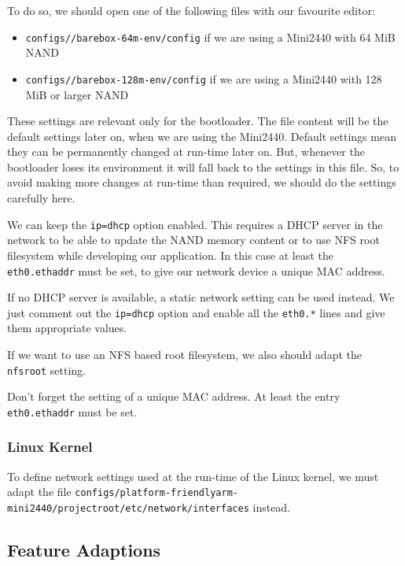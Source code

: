 To do so, we should open one of the following files with our favourite editor:

\begin{itemize}
 \item \texttt{configs/\ptxdistPlatformName /barebox-64m-env/config} if we are using
 a Mini2440 with 64 MiB NAND
 \item \texttt{configs/\ptxdistPlatformName /barebox-128m-env/config} if we are using
 a Mini2440 with 128 MiB or larger NAND
\end{itemize}

These settings are relevant only for the bootloader. The file content will be
the default settings later on, when we are using the Mini2440. Default
settings mean they can be permanently changed at run-time later on. But, whenever
the bootloader loses its environment it will fall back to the settings in this
file. So, to avoid making more changes at run-time than required, we should do the
settings carefully here.

We can keep the \texttt{ip=dhcp} option enabled. This requires a DHCP server in
the network to be able to update the NAND memory content or to use NFS root
filesystem while developing our application. In this case at least the
\texttt{eth0.ethaddr} must be set, to give our network device a unique MAC
address.

If no DHCP server is available, a static network setting can be used instead.
We just comment out the \texttt{ip=dhcp} option and enable all the
\texttt{eth0.*} lines and give them appropriate values.

If we want to use an NFS based root filesystem, we also should adapt the
\texttt{nfsroot} setting.

\begin{important}
Don't forget the setting of a unique MAC address. At least the entry
\texttt{eth0.ethaddr} must be set.
\end{important}

\subsubsection{Linux Kernel}			\label{sec:linuxnetwork}

To define network settings used at the run-time of the Linux kernel, we must
adapt the file
\texttt{configs/platform-friendlyarm-mini2440/projectroot/etc/network/interfaces}
instead.

\subsection{Feature Adaptions}		\label{sec:featureadaptions}

